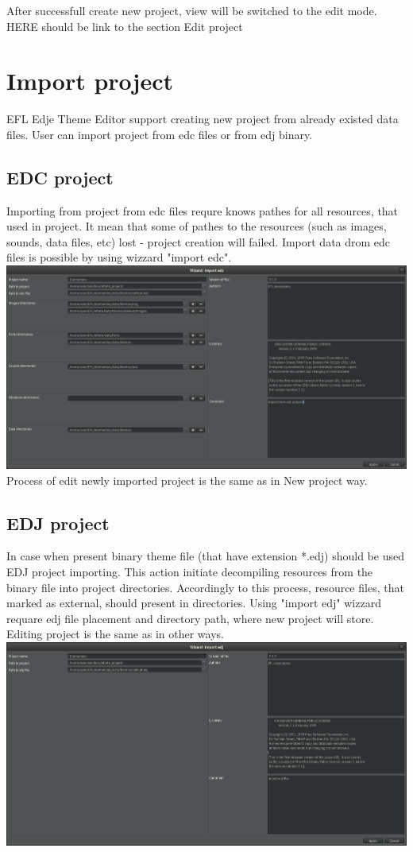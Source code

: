 \documentclass[titlepage,oneside,11pt]{book}
\begin{document}
After successfull create new project, view will be switched to the edit mode. HERE should be link to the section Edit project %
\section{Import project}
EFL Edje Theme Editor support creating new project from already existed data files.
User can import project from edc files or from edj binary.
\subsection{EDC project}
Importing from project from edc files requre knows pathes for all resources, that used in project. It mean that some of pathes to the resources (such as images, sounds, data files, etc) lost - project creation will failed.
Import data drom edc files is possible by using wizzard "{}import edc"{}.\newline
\includegraphics[scale=0.3]{images/wizzard_import_edc.png}\newline 
Process of edit newly imported project is the same as in New project way.
\subsection{EDJ project}
In case when present binary theme file (that have extension *.edj) should be used EDJ project importing. This action initiate decompiling resources from the binary file into project directories. Accordingly to this process, resource files, that marked as external, should present in directories.
Using "{}import edj"{} wizzard requare edj file placement and directory path, where new project will store. Editing project is the same as in other ways.
\includegraphics[scale=0.3]{images/wizzard_import_edj.png}\newline 
\end{document}
